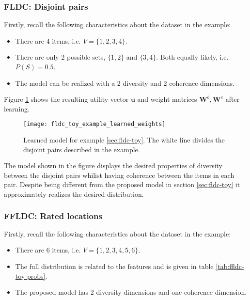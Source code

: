 \subsubsection{FLDC: Disjoint pairs}

Firstly, recall the following characteristics about the dataset in the example:

\begin{itemize}
  \item There are 4 items, i.e. $V = \{1,2,3,4\}$.
  \item There are only 2 possible sets, $\{1,2\}$ and $\{3,4\}$. Both equally likely, i.e. $P(S) = 0.5$.
  \item The model can be realized with a 2 diversity and 2 coherence dimensions.
\end{itemize}

Figure \ref{fig:fldc-toy-learned-weights} shows the resulting utility vector $\mathbf{u}$ and weight matrices $\mathbf{W}^{b}, \mathbf{W}^{e}$ after learning.

\begin{figure}
  \centering
  \texttt{[image: fldc\_toy\_example\_learned\_weights]}
  \caption{Learned model for example \ref{sec:fldc-toy}. The white line divides the disjoint pairs described in the example.}
  \label{fig:fldc-toy-learned-weights}
\end{figure}

The model shown in the figure displays the desired properties of diversity between the disjoint pairs whilist having coherence between the items in each pair. Despite being different from the proposed model in section \ref{sec:fldc-toy} it approximately realizes the desired distribution.

\subsubsection{FFLDC: Rated locations}

Firstly, recall the following characteristics about the dataset in the example:

\begin{itemize}
  \item There are 6 items, i.e. $V = \{1,2,3,4,5,6\}$.
  \item The full distribution is related to the features and is given in table \ref{tab:ffldc-toy-probs}.
  \item The proposed model has 2 diversity dimensions and one coherence dimension.
\end{itemize}

